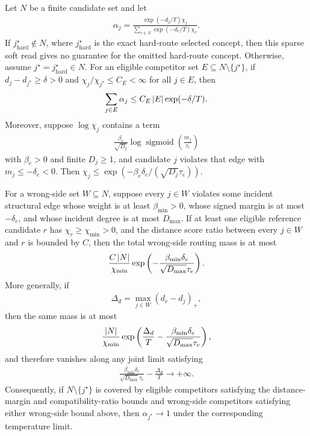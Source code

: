 \begin{theorem}
\label{thm:soft-routing-hard-limit:formal}
Let $N$ be a finite candidate set and let
\begin{align*}
\alpha_j=\frac{\exp(-d_j/T)\chi_j}{\sum_{r\in N}\exp(-d_r/T)\chi_r}.
\end{align*}
If $j^\star_{\mathrm{hard}}\notin N$, where $j^\star_{\mathrm{hard}}$ is the exact hard-route selected concept, then this sparse soft read gives no guarantee for the omitted hard-route concept. Otherwise, assume $j^\star=j^\star_{\mathrm{hard}}\in N$. For an eligible competitor set $E\subseteq N\setminus\{j^\star\}$, if $d_j-d_{j^\star}\ge\delta>0$ and $\chi_j/\chi_{j^\star}\le C_E<\infty$ for all $j\in E$, then
\begin{align*}
\sum_{j\in E}\alpha_j\le C_E\left\lvert E\right\rvert\exp(-\delta/T).
\end{align*}
Moreover, suppose $\log\chi_j$ contains a term
\begin{align*}
\frac{\beta_e}{\sqrt{D_j}}
\log\operatorname{sigmoid}\left(\frac{m_j}{\tau_e}\right)
\end{align*}
with $\beta_e>0$ and finite $D_j\ge1$, and candidate $j$ violates that edge with $m_j\le-\delta_e<0$. Then $\chi_j\le \exp(-\beta_e\delta_e/(\sqrt{D_j}\tau_e))$.

For a wrong-side set $W\subseteq N$, suppose every $j\in W$ violates some incident structural edge whose weight is at least $\beta_{\min}>0$, whose signed margin is at most $-\delta_e$, and whose incident degree is at most $D_{\max}$. If at least one eligible reference candidate $r$ has $\chi_r\ge\chi_{\min}>0$, and the distance score ratio between every $j\in W$ and $r$ is bounded by $C$, then the total wrong-side routing mass is at most
\begin{align*}
\frac{C\left\lvert N\right\rvert}{\chi_{\min}}
\exp\left(-\frac{\beta_{\min}\delta_e}{\sqrt{D_{\max}}\tau_e}\right).
\end{align*}
More generally, if
\begin{align*}
\Delta_d=\max_{j\in W}(d_r-d_j)_+,
\end{align*}
then the same mass is at most
\begin{align*}
\frac{\left\lvert N\right\rvert}{\chi_{\min}}
\exp\left(
\frac{\Delta_d}{T}
-
\frac{\beta_{\min}\delta_e}{\sqrt{D_{\max}}\tau_e}
\right),
\end{align*}
and therefore vanishes along any joint limit satisfying
\begin{align*}
\frac{\beta_{\min}\delta_e}{\sqrt{D_{\max}}\tau_e}-\frac{\Delta_d}{T}\to+\infty.
\end{align*}
Consequently, if $N\setminus\{j^\star\}$ is covered by eligible competitors satisfying the distance-margin and compatibility-ratio bounds and wrong-side competitors satisfying either wrong-side bound above, then $\alpha_{j^\star}\to1$ under the corresponding temperature limit.
\end{theorem}
